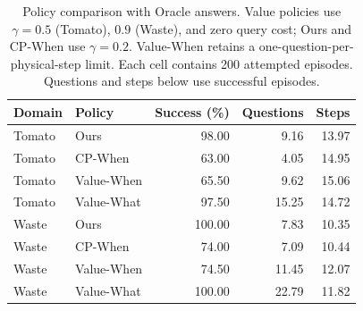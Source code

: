 \begin{table}[t]
\centering
\caption{Policy comparison with Oracle answers. Value policies use $\gamma=0.5$ (Tomato), $0.9$ (Waste), and zero query cost; Ours and CP-When use $\gamma=0.2$. Value-When retains a one-question-per-physical-step limit. Each cell contains 200 attempted episodes. Questions and steps below use successful episodes.}
\label{tab:policy_value_rerun_20261005}
\begin{tabular}{llrrr}
\hline Domain & Policy & Success (\%) & Questions & Steps \\
\hline
Tomato & Ours & 98.00 & 9.16 & 13.97 \\
Tomato & CP-When & 63.00 & 4.05 & 14.95 \\
Tomato & Value-When & 65.50 & 9.62 & 15.06 \\
Tomato & Value-What & 97.50 & 15.25 & 14.72 \\
Waste & Ours & 100.00 & 7.83 & 10.35 \\
Waste & CP-When & 74.00 & 7.09 & 10.44 \\
Waste & Value-When & 74.50 & 11.45 & 12.07 \\
Waste & Value-What & 100.00 & 22.79 & 11.82 \\
\hline
\end{tabular}
\end{table}

